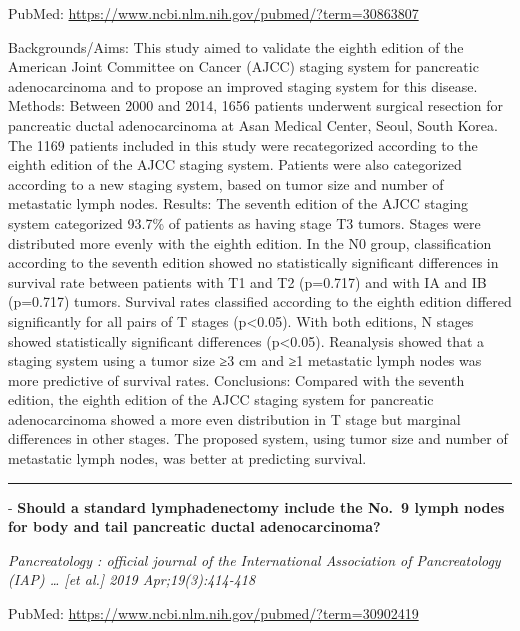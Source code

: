 \documentclass[]{article}
\begin{document}
PubMed: \url{https://www.ncbi.nlm.nih.gov/pubmed/?term=30863807}

Backgrounds/Aims: This study aimed to validate the eighth edition of the
American Joint Committee on Cancer (AJCC) staging system for pancreatic
adenocarcinoma and to propose an improved staging system for this
disease. Methods: Between 2000 and 2014, 1656 patients underwent
surgical resection for pancreatic ductal adenocarcinoma at Asan Medical
Center, Seoul, South Korea. The 1169 patients included in this study
were recategorized according to the eighth edition of the AJCC staging
system. Patients were also categorized according to a new staging
system, based on tumor size and number of metastatic lymph nodes.
Results: The seventh edition of the AJCC staging system categorized
93.7\% of patients as having stage T3 tumors. Stages were distributed
more evenly with the eighth edition. In the N0 group, classification
according to the seventh edition showed no statistically significant
differences in survival rate between patients with T1 and T2 (p=0.717)
and with IA and IB (p=0.717) tumors. Survival rates classified according
to the eighth edition differed significantly for all pairs of T stages
(p\textless{}0.05). With both editions, N stages showed statistically
significant differences (p\textless{}0.05). Reanalysis showed that a
staging system using a tumor size ≥3 cm and ≥1 metastatic lymph nodes
was more predictive of survival rates. Conclusions: Compared with the
seventh edition, the eighth edition of the AJCC staging system for
pancreatic adenocarcinoma showed a more even distribution in T stage but
marginal differences in other stages. The proposed system, using tumor
size and number of metastatic lymph nodes, was better at predicting
survival.

{}

{}

\begin{center}\rule{0.5\linewidth}{\linethickness}\end{center}

 - \textbf{Should a standard lymphadenectomy include the No.~9 lymph
nodes for body and tail pancreatic ductal adenocarcinoma?}

\emph{Pancreatology : official journal of the International Association
of Pancreatology (IAP) \ldots{} {[}et al.{]} 2019 Apr;19(3):414-418}

PubMed: \url{https://www.ncbi.nlm.nih.gov/pubmed/?term=30902419}
\end{document}
